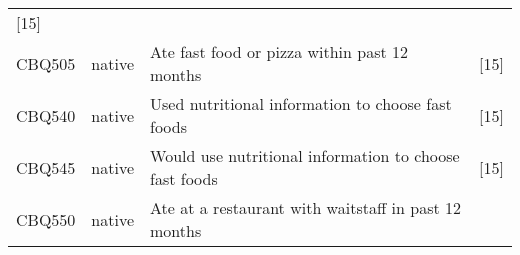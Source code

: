 \documentclass[]{article}
\begin{document}
\begin{longtable}[]{@{}llll@{}}
\begin{minipage}[t]{0.31\columnwidth}
{[}15{]}\strut
\end{minipage}\tabularnewline
\begin{minipage}[t]{0.10\columnwidth}\raggedright
CBQ505\strut
\end{minipage} & \begin{minipage}[t]{0.05\columnwidth}\raggedright
native\strut
\end{minipage} & \begin{minipage}[t]{0.43\columnwidth}\raggedright
Ate fast food or pizza within past 12 months\strut
\end{minipage} & \begin{minipage}[t]{0.31\columnwidth}\raggedright
{[}15{]}\strut
\end{minipage}\tabularnewline
\begin{minipage}[t]{0.10\columnwidth}\raggedright
CBQ540\strut
\end{minipage} & \begin{minipage}[t]{0.05\columnwidth}\raggedright
native\strut
\end{minipage} & \begin{minipage}[t]{0.43\columnwidth}\raggedright
Used nutritional information to choose fast foods\strut
\end{minipage} & \begin{minipage}[t]{0.31\columnwidth}\raggedright
{[}15{]}\strut
\end{minipage}\tabularnewline
\begin{minipage}[t]{0.10\columnwidth}\raggedright
CBQ545\strut
\end{minipage} & \begin{minipage}[t]{0.05\columnwidth}\raggedright
native\strut
\end{minipage} & \begin{minipage}[t]{0.43\columnwidth}\raggedright
Would use nutritional information to choose fast foods\strut
\end{minipage} & \begin{minipage}[t]{0.31\columnwidth}\raggedright
{[}15{]}\strut
\end{minipage}\tabularnewline
\begin{minipage}[t]{0.10\columnwidth}\raggedright
CBQ550\strut
\end{minipage} & \begin{minipage}[t]{0.05\columnwidth}\raggedright
native\strut
\end{minipage} & \begin{minipage}[t]{0.43\columnwidth}\raggedright
Ate at a restaurant with waitstaff in past 12 months\strut

\end{minipage}
\end{longtable}
\end{document}
